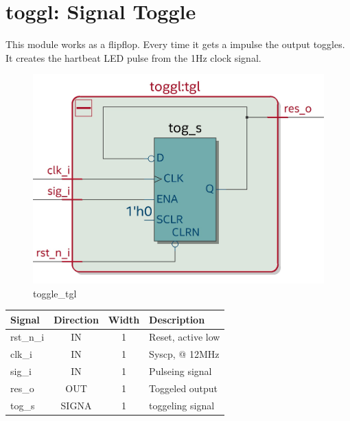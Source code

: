 \documentclass[12pt,a4 paper] {report}
\begin{document}
\newpage

\section{toggl: Signal Toggle}
This module works as a flipflop. Every time it gets a impulse the output toggles. It creates the hartbeat LED pulse 
from the 1Hz clock signal.
\begin{figure}[h]
	\centering	
	\includegraphics[scale=0.15]{../png/toggl_tgl.png}
	\caption{toggle\_tgl}
\end{figure}
\begin{center}
	\begin{tabular}{ | p{2cm} | c | c | p{5cm} |}
		\hline
		\textbf{Signal} & \textbf{Direction} & \textbf{Width} & \textbf{Description} \\
		\hline
		\hline
	  rst\_n\_i & IN & 1 & Reset, active low \\
	  \hline
		clk\_i & IN & 1 & Syscp, @ 12MHz \\
		\hline
		sig\_i & IN & 1 & Pulseing signal \\
		\hline
		res\_o & OUT & 1 & Toggeled output \\
		\hline
		\hline	
		tog\_s & SIGNA & 1  & toggeling signal \\
		\hline
	\end{tabular}
\end{center}

\newpage
\end{document}
